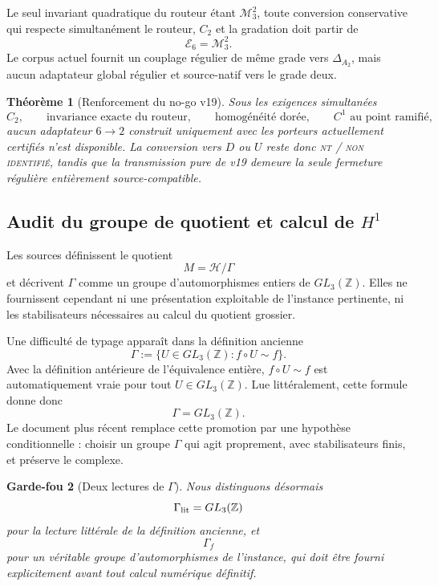 \documentclass[11pt,a4paper]{article}
\newtheorem{theorem}{Théorème}[section]
\newtheorem{guardrail}[theorem]{Garde-fou}
\newcommand{\statusNT}{\textsc{nt / non identifié}}
\begin{document}
Le seul invariant quadratique du routeur étant $\mathcal M_3^2$, toute conversion conservative qui respecte simultanément le routeur, $C_2$ et la gradation doit partir de
\[
 \mathscr E_6=\mathcal M_3^2.
\]
Le corpus actuel fournit un couplage régulier de même grade vers $\Delta_{A_2}$, mais aucun adaptateur global régulier et source-natif vers le grade deux.

\begin{theorem}[Renforcement du no-go v19]\label{thm:v20-conversion-verdict}
Sous les exigences simultanées
\[
 C_2,\qquad
 \text{invariance exacte du routeur},\qquad
 \text{homogénéité dorée},\qquad
 C^1\text{ au point ramifié},
\]
aucun adaptateur $6\to2$ construit uniquement avec les porteurs actuellement certifiés n'est disponible. La conversion vers $D$ ou $U$ reste donc \statusNT{}, tandis que la transmission pure de v19 demeure la seule fermeture régulière entièrement source-compatible.
\end{theorem}

\subsection{Audit du groupe de quotient et calcul de $H^1$}

Les sources définissent le quotient
\[
 M=\mathcal H/\Gamma
\]
et décrivent $\Gamma$ comme un groupe d'automorphismes entiers de $GL_3(\mathbb Z)$. Elles ne fournissent cependant ni une présentation exploitable de l'instance pertinente, ni les stabilisateurs nécessaires au calcul du quotient grossier.

Une difficulté de typage apparaît dans la définition ancienne
\[
 \Gamma
 :=
 \{U\in GL_3(\mathbb Z): f\circ U\sim f\}.
\]
Avec la définition antérieure de l'équivalence entière, $f\circ U\sim f$ est automatiquement vraie pour tout $U\in GL_3(\mathbb Z)$. Lue littéralement, cette formule donne donc
\[
 \Gamma=GL_3(\mathbb Z).
\]
Le document plus récent remplace cette promotion par une hypothèse conditionnelle : choisir un groupe $\Gamma$ qui agit proprement, avec stabilisateurs finis, et préserve le complexe.

\begin{guardrail}[Deux lectures de $\Gamma$]
Nous distinguons désormais
\[
 \Gamma_{\rm lit}=GL_3(\mathbb Z)
\]
pour la lecture littérale de la définition ancienne, et
\[
 \Gamma_f
\]
pour un véritable groupe d'automorphismes de l'instance, qui doit être fourni explicitement avant tout calcul numérique définitif.
\end{guardrail}
\end{document}
